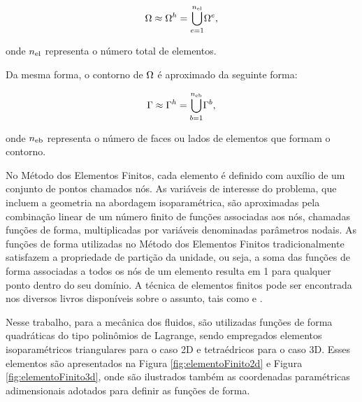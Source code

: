 \begin{align}
	\Omega \approx \Omega^h = {\bigcup_{e = 1}^{n_{\mathrm{el}}}} \Omega^e,
\end{align}

\noindent onde $n_{\mathrm{el}}$ representa o número total de elementos.

Da mesma forma, o contorno de $\Omega$ é aproximado da seguinte forma:

\begin{align}
	\Gamma \approx \Gamma^h = {\bigcup_{b = 1}^{n_{\mathrm{eb}}}} \Gamma^{b},
\end{align}

\noindent onde $n_{\mathrm{eb}}$ representa o número de faces ou lados de elementos que formam o contorno.

No Método dos Elementos Finitos, cada elemento é definido com auxílio de um conjunto de pontos chamados nós. As variáveis de interesse do problema, que incluem a geometria na abordagem isoparamétrica, são aproximadas pela combinação linear de um número finito de funções associadas aos nós, chamadas funções de forma, multiplicadas por variáveis denominadas parâmetros nodais. As funções de forma utilizadas no Método dos Elementos Finitos tradicionalmente satisfazem a propriedade de partição da unidade, ou seja, a soma das funções de forma associadas a todos os nós de um elemento resulta em 1 para qualquer ponto dentro do seu domínio. A técnica de elementos finitos pode ser encontrada nos diversos livros disponíveis sobre o assunto, tais como  e .

Nesse trabalho, para a mecânica dos fluidos, são utilizadas funções de forma quadráticas do tipo polinômios de Lagrange, sendo empregados elementos isoparamétricos triangulares para o caso 2D e tetraédricos para o caso 3D. Esses elementos são apresentados na Figura \ref{fig:elementoFinito2d} e Figura \ref{fig:elementoFinito3d}, onde são ilustrados também as coordenadas paramétricas adimensionais adotados para definir as funções de forma. 

